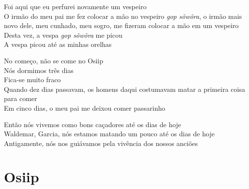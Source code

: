 \noindent   Foi aqui que eu perfurei novamente um vespeiro\\
  O irmão do meu pai me fez colocar a mão no vespeiro \textit{gop sõwõra}, o irmão mais novo dele, meu cunhado, meu sogro, me fizeram colocar a mão em um vespeiro \\
  Desta vez, a vespa \textit{gop sõwõra} me picou\\
  A vespa picou até as minhas orelhas
 
 \smallskip
 \begin{center}\end{center}
 \smallskip
 
\noindent   No começo, não se come no Osiip\\
  Nós dormimos três dias\\
  Fica-se muito fraco\\
  Quando dez dias passavam, os homens daqui costumavam matar a primeira coisa para comer\\
  Em cinco dias, o meu pai me deixou comer passarinho
 
 \smallskip
 \begin{center}\end{center}
 \smallskip
 
\noindent   Então nós vivemos como bons caçadores até os dias de hoje\\
  Waldemar, Garcia, nós estamos matando um pouco até os dias de hoje\\
  Antigamente, nós nos guiávamos pela vivência dos nossos anciões

\chapter{Osiip}

